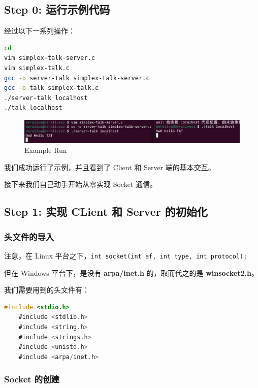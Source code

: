 \documentclass[14pt,a4paper,UTF8,twoside]{article}
\begin{document}
\subsection*{Step 0: 运行示例代码}

经过以下一系列操作：

\begin{lstlisting}[language = bash]
cd
vim simplex-talk-server.c
vim simplex-talk.c
gcc -o server-talk simplex-talk-server.c
gcc -o talk simplex-talk.c
./server-talk localhost
./talk localhost
\end{lstlisting}

\begin{figure}[H]
    \centering
    \includegraphics[width=0.8\linewidth]{lab7/example.png}
    \caption{Example Run}
    \label{fig:test}
\end{figure}

我们成功运行了示例，并且看到了 Client 和 Server 端的基本交互。

接下来我们自己动手开始从零实现 Socket 通信。

\subsection{Step 1: 实现 CLient 和 Server 的初始化}

\subsubsection*{头文件的导入}

注意，在 Linux 平台之下，\texttt{int socket(int af, int type, int protocol);}

但在 Windows 平台下，是没有 \textbf{arpa/inet.h} 的，取而代之的是 \textbf{winsocket2.h}。

我们需要用到的头文件有：

\begin{lstlisting}[language=C, title={Include Header}]
    #include <stdio.h>
    #include <stdlib.h>
    #include <string.h>
    #include <strings.h>
    #include <unistd.h>
    #include <arpa/inet.h>
\end{lstlisting}

\subsubsection*{Socket 的创建}
\end{document}
